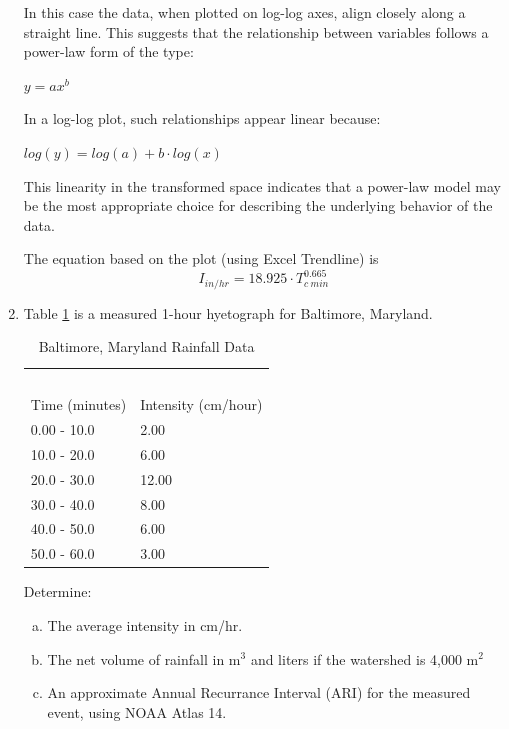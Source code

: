 \documentclass[12pt]{article}
\begin{document}
\begin{enumerate}
In this case the data, when plotted on log-log axes, align closely along a straight line. This suggests that the relationship between variables follows a power-law form of the type:

$ y=ax^b$
 
In a log-log plot, such relationships appear linear because:


$log(y)=log(a)+b \cdot log(x)$

This linearity in the transformed space indicates that a power-law model may be the most appropriate choice for describing the underlying behavior of the data.

The equation based on the plot (using Excel Trendline) is
\begin{equation}
I_{in/hr} = 18.925 \cdot T_{c~min}^{0.665}
\end{equation}

\clearpage

\item Table \ref{tab:Baltimore} is a measured 1-hour hyetograph for Baltimore, Maryland.

\begin{table}[h!]
\centering
\caption{Baltimore, Maryland Rainfall Data}
\begin{tabular}{p{2.0in}p{2.0in}} %
~&~\\
Time (minutes) & Intensity (cm/hour) \\
\hline
\hline
0.00 - 10.0 & 2.00 \\
10.0 - 20.0 & 6.00 \\
20.0 - 30.0 & 12.00 \\
30.0 - 40.0 & 8.00 \\
40.0 - 50.0 & 6.00 \\
50.0 - 60.0 & 3.00 \\
\hline
\end{tabular}
\label{tab:Baltimore}
\end{table}

Determine:
    \begin{enumerate}[a)]
        \item The average intensity in cm/hr.
        \item The net volume of rainfall in m$^3$ and liters if the watershed is 4,000 m$^2$
        \item An approximate Annual Recurrance Interval (ARI) for the measured event, using NOAA Atlas 14. 
    \end{enumerate}


\end{enumerate}
\end{document}
